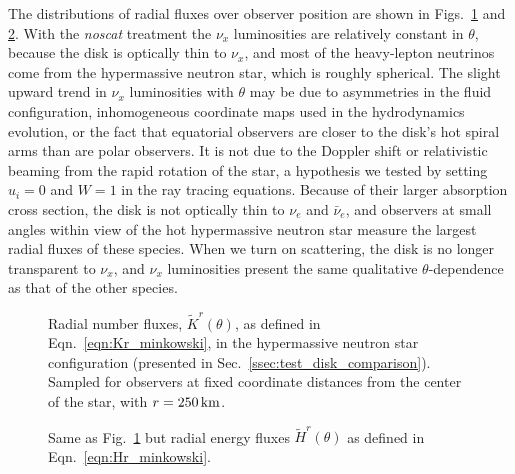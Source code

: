 \documentclass[aps,floatfix,prd,superscriptaddress,twocolumn]{revtex4-1}
\begin{document}
The distributions of radial fluxes over observer position are shown
in Figs.~\ref{fig:nsns_theta_distrib_Kr} and \ref{fig:nsns_theta_distrib_Hr}.
With the \emph{noscat} treatment the $\nu_x$ luminosities are relatively
constant in $\theta$, because the disk is optically thin to $\nu_x$,
and most of the heavy-lepton neutrinos come from the hypermassive neutron star,
which is roughly spherical.
The slight upward trend in $\nu_x$ luminosities with $\theta$ may be due to
asymmetries in the fluid configuration,
inhomogeneous coordinate maps used in the hydrodynamics evolution,
or the fact that equatorial observers are closer to the disk's hot spiral arms
than are polar observers.
It is not due to the Doppler shift or relativistic beaming
from the rapid rotation of the star,
a hypothesis we tested by setting $u_i=0$ and $W=1$ in the ray
tracing equations.
Because of their larger absorption cross section,
the disk is not optically thin to $\nu_e$ and $\bar{\nu}_e$,
and observers at small angles within view of the hot hypermassive neutron star
measure the largest radial fluxes of these species.
When we turn on scattering, the disk is no longer transparent to $\nu_x$,
and $\nu_x$ luminosities present the same qualitative $\theta$-dependence
as that of the other species.

\begin{figure}
  \resizebox{\columnwidth}{!}{}
  \caption{Radial number fluxes, $\tilde{K}^r(\theta)$,
    as defined in Eqn.~\ref{eqn:Kr_minkowski},
    in the hypermassive neutron star configuration
    (presented in Sec.~\ref{ssec:test_disk_comparison}).
    Sampled for observers at fixed coordinate distances from the center
    of the star, with $r=250\,{\rm km}$.
  }
  \label{fig:nsns_theta_distrib_Kr}
\end{figure}

\begin{figure}
  \resizebox{\columnwidth}{!}{}
  \caption{Same as Fig.~\ref{fig:nsns_theta_distrib_Kr} but radial energy
    fluxes $\tilde{H}^r(\theta)$ as defined in Eqn.~\ref{eqn:Hr_minkowski}.
  }
  \label{fig:nsns_theta_distrib_Hr}
\end{figure}
\end{document}

